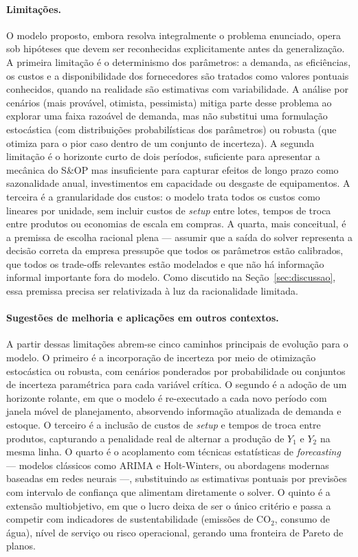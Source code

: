 \documentclass[11pt,a4paper]{article}
\begin{document}
\paragraph{Limitações.}
O modelo proposto, embora resolva integralmente o problema enunciado, opera sob hipóteses que devem ser reconhecidas explicitamente antes da generalização. A primeira limitação é o determinismo dos parâmetros: a demanda, as eficiências, os custos e a disponibilidade dos fornecedores são tratados como valores pontuais conhecidos, quando na realidade são estimativas com variabilidade. A análise por cenários (mais provável, otimista, pessimista) mitiga parte desse problema ao explorar uma faixa razoável de demanda, mas não substitui uma formulação estocástica (com distribuições probabilísticas dos parâmetros) ou robusta (que otimiza para o pior caso dentro de um conjunto de incerteza). A segunda limitação é o horizonte curto de dois períodos, suficiente para apresentar a mecânica do S\&OP mas insuficiente para capturar efeitos de longo prazo como sazonalidade anual, investimentos em capacidade ou desgaste de equipamentos. A terceira é a granularidade dos custos: o modelo trata todos os custos como lineares por unidade, sem incluir custos de \emph{setup} entre lotes, tempos de troca entre produtos ou economias de escala em compras. A quarta, mais conceitual, é a premissa de escolha racional plena --- assumir que a saída do solver representa a decisão correta da empresa pressupõe que todos os parâmetros estão calibrados, que todos os trade-offs relevantes estão modelados e que não há informação informal importante fora do modelo. Como discutido na Seção~\ref{sec:discussao}, essa premissa precisa ser relativizada à luz da racionalidade limitada.

\paragraph{Sugestões de melhoria e aplicações em outros contextos.}
A partir dessas limitações abrem-se cinco caminhos principais de evolução para o modelo. O primeiro é a incorporação de incerteza por meio de otimização estocástica ou robusta, com cenários ponderados por probabilidade ou conjuntos de incerteza paramétrica para cada variável crítica. O segundo é a adoção de um horizonte rolante, em que o modelo é re-executado a cada novo período com janela móvel de planejamento, absorvendo informação atualizada de demanda e estoque. O terceiro é a inclusão de custos de \emph{setup} e tempos de troca entre produtos, capturando a penalidade real de alternar a produção de $Y_1$ e $Y_2$ na mesma linha. O quarto é o acoplamento com técnicas estatísticas de \emph{forecasting} --- modelos clássicos como ARIMA e Holt-Winters, ou abordagens modernas baseadas em redes neurais ---, substituindo as estimativas pontuais por previsões com intervalo de confiança que alimentam diretamente o solver. O quinto é a extensão multiobjetivo, em que o lucro deixa de ser o único critério e passa a competir com indicadores de sustentabilidade (emissões de CO$_2$, consumo de água), nível de serviço ou risco operacional, gerando uma fronteira de Pareto de planos.
\end{document}
